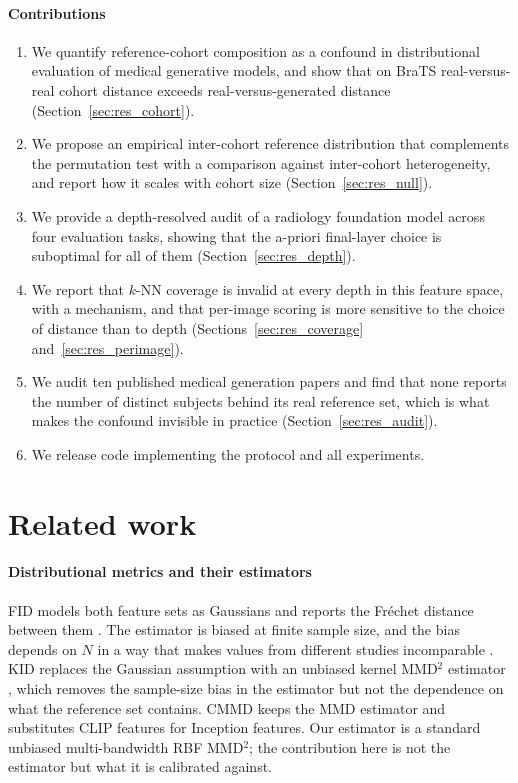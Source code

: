 \documentclass[preprint,12pt,authoryear]{elsarticle}
\begin{document}
\paragraph{Contributions}
\begin{enumerate}[leftmargin=*, topsep=2pt, itemsep=2pt]
\item We quantify reference-cohort composition as a confound in distributional
      evaluation of medical generative models, and show that on BraTS
      real-versus-real cohort distance exceeds real-versus-generated distance
      (Section~\ref{sec:res_cohort}).
\item We propose an empirical inter-cohort reference distribution that
      complements the permutation test with a comparison against inter-cohort
      heterogeneity,
      and report how it scales with cohort size (Section~\ref{sec:res_null}).
\item We provide a depth-resolved audit of a radiology foundation model across
      four evaluation tasks, showing that the a-priori final-layer choice is
      suboptimal for all of them (Section~\ref{sec:res_depth}).
\item We report that $k$-NN coverage is invalid at every depth in this feature
      space, with a mechanism, and that per-image scoring is more sensitive to
      the choice of distance than to depth (Sections~\ref{sec:res_coverage}
      and~\ref{sec:res_perimage}).
\item We audit ten published medical generation papers and find that none
      reports the number of distinct subjects behind its real reference set,
      which is what makes the confound invisible in practice
      (Section~\ref{sec:res_audit}).
\item We release code implementing the protocol and all experiments.
\end{enumerate}

\section{Related work}
\label{sec:related}

\paragraph{Distributional metrics and their estimators}
FID models both feature sets as Gaussians and reports the Fr\'echet distance
between them \citep{heusel2017gans}. The estimator is biased at finite sample
size, and the bias depends on $N$ in a way that makes values from different
studies incomparable \citep{chong2020effectively}. KID
\citep{binkowski2018demystifying} replaces the Gaussian assumption with an
unbiased kernel MMD$^2$ estimator \citep{gretton2012kernel}, which removes the
sample-size bias in the estimator but not the dependence on what the reference
set contains. CMMD \citep{jayasumana2024cmmd} keeps the MMD estimator and
substitutes CLIP features for Inception features. Our estimator is a standard
unbiased multi-bandwidth RBF MMD$^2$; the contribution here is not the
estimator but what it is calibrated against.
\end{document}
